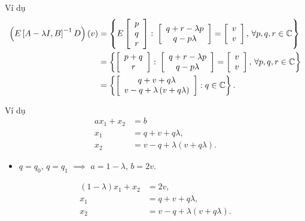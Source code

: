 \begin{frame}{Ví dụ}
    \begin{align}
        \left(E\left[A-\lambda I,B\right]^{-1}D\right)\left(v\right)&=\left\{ E\left[\begin{array}{c}
        p\\
        q\\
        r
        \end{array}\right]\colon\left[\begin{array}{c}
        q+r-\lambda p\\
        q-p\lambda
        \end{array}\right]=\left[\begin{array}{c}
        v\\
        v
        \end{array}\right],\,\forall p,q,r\in\mathbb{C}\right\} \nonumber\\
        &=\left\{ \left[\begin{array}{c}
        p+q\\
        r
        \end{array}\right]\colon\left[\begin{array}{c}
        q+r-\lambda p\\
        q-p\lambda
        \end{array}\right]=\left[\begin{array}{c}
        v\\
        v
        \end{array}\right],\,\forall p,q,r\in\mathbb{C}\right\} \nonumber\\
        &=\left\{ \left[\begin{array}{c}
        q+v+q\lambda\\
        v-q+\lambda\left(v+q\lambda\right)
        \end{array}\right]:q\in\mathbb{C}\right\} .
    \end{align}
\end{frame}

\begin{frame}{Ví dụ}
    \begin{align}
        ax_{1}+x_{2}&=b\\
        x_{1}&=q+v+q\lambda,\\
        x_{2}&=v-q+\lambda\left(v+q\lambda\right).
    \end{align}
    \begin{itemize}
        \item \(q = q_{0}\), \(q = q_{1}\) \(\implies\) \(a = 1 - \lambda\), \(b = 2v.\)
    \end{itemize}
    \begin{align}
        \left(1-\lambda\right)x_{1}+x_{2}&=2v,\\    
        x_{1}&=q+v+q\lambda,\\
        x_{2}&=v-q+\lambda\left(v+q\lambda\right).
    \end{align}
\end{frame}

